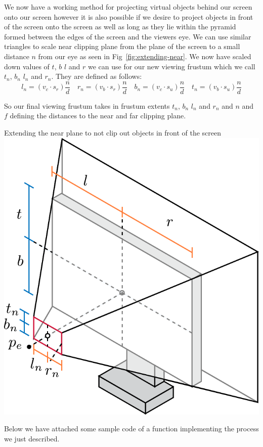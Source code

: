 We now have a working method for projecting virtual objects behind our screen onto our screen however it is also possible if we desire to project objects in front of the screen onto the screen as well as long as they lie within the pyramid formed between the edges of the screen and the viewers eye. We can use similar triangles to scale near clipping plane from the plane of the screen to a small distance $n$ from our eye as seen in Fig~\ref{fig:extending-near}. We now have scaled down values of $t$, $b$ $l$ and $r$ we can use for our new viewing frustum which we call $t_n$, $b_n$ $l_n$ and $r_n$. They are defined as follows:
\[
    l_n = (v_c \cdot s_r) \frac{n}{d} \quad r_n = (v_b \cdot s_r) \frac{n}{d} \quad b_n = (v_c \cdot s_u) \frac{n}{d} \quad t_n = (v_b \cdot s_u) \frac{n}{d}
\]

So our final viewing frustum takes in frustum extents $t_n$, $b_n$ $l_n$ and $r_n$ and $n$ and $f$ defining the distances to the near and far clipping plane.
\begin{figureBox}[label={fig:extending-near}, width=0.8\linewidth]{Extending the near plane to not clip out objects in front of the screen}
    \centering
    \includegraphics[width = 0.5\linewidth]{./background/figures/projection/extending-near.pdf}
\end{figureBox}


Below we have attached some sample code of a function implementing the process we just described.

